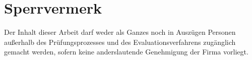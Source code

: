\chapter*{Sperrvermerk}
\thispagestyle{plain}

\begin{tcolorbox}[
	width=\linewidth,
	colframe=red,
	colback=white,
	sharp corners,
	boxrule=1mm,
	halign=center
	]{
	\large Der Inhalt dieser Arbeit darf weder als Ganzes noch in Auszügen Personen außerhalb des Prüfungsprozesses und des Evaluationsverfahrens zugänglich gemacht werden, sofern keine anderslautende Genehmigung der Firma \firma vorliegt.}

\end{tcolorbox}
